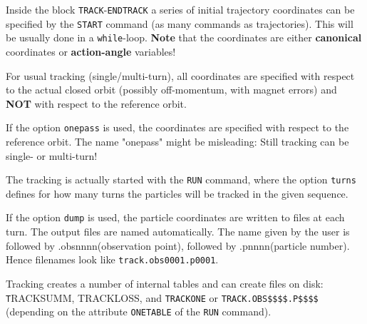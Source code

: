 


Inside the block \texttt{TRACK}-\texttt{ENDTRACK} a series 
of initial trajectory coordinates can be specified by the \texttt{START} 
command (as many commands as trajectories). This will be usually done in a 
\texttt{while}-loop. \textbf{Note} that the coordinates are either 
\textbf{canonical} coordinates or \textbf{action-angle} variables!

For usual tracking (single/multi-turn), all coordinates are specified
with respect to the actual closed orbit (possibly off-momentum, with
magnet errors) and \textbf{NOT} with respect to the reference orbit. 
            
If the option \texttt{onepass} is used, the coordinates are specified
with respect to the reference orbit. The name "onepass" might be
misleading: Still tracking can be single- or multi-turn!   
            
The tracking is actually started with the \texttt{RUN} command, where
the option \texttt{turns} defines for how many turns the particles will
be tracked in the given sequence. 
          
If the option \texttt{dump} is used, the particle coordinates are
written to files at each turn. The output files are named
automatically. The name given by the user is followed by
.obsnnnn(observation point), followed by .pnnnn(particle number). Hence
filenames look like \texttt{track.obs0001.p0001}.  

Tracking creates a number of internal tables and can create files on disk: 
{\texttt TRACKSUMM, TRACKLOSS}, and \texttt{TRACKONE} or
\texttt{TRACK.OBS\$\$\$\$.P\$\$\$\$} (depending on the attribute
\texttt{ONETABLE} of the \texttt{RUN} command).

